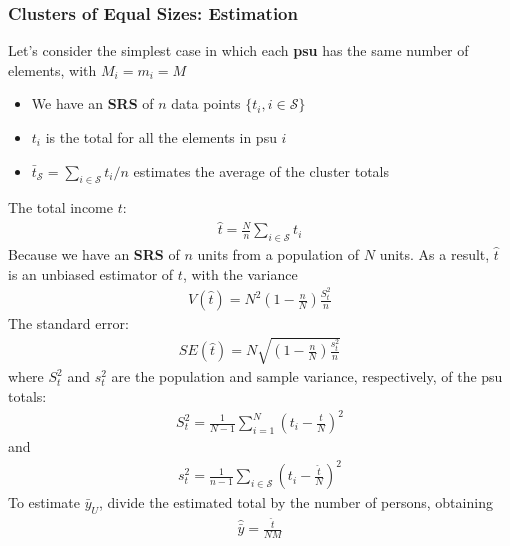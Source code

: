 \documentclass[a4paper,twoside,11pt]{article}
\begin{document}
\subsubsection{Clusters of Equal Sizes: Estimation}
Let’s consider the simplest case in which each \textbf{psu} has the same number of elements, with $M_i = m_i = M$
\begin{itemize}
    \item We have an \textbf{SRS} of $n$ data points $\{t_i, i \in \mathcal{S} \}$
    \item $t_i$ is the total for all the elements in psu $i$
    \item $\bar{t}_{\mathcal{S}} = \sum_{i \in \mathcal{S}} t_i/n$ estimates the average of the cluster totals
\end{itemize}
The total income $t:$
\begin{equation*}
\begin{aligned}
\hat{t} = \frac{N}{n} \sum_{i \in \mathcal{S}}t_i
\end{aligned}
\end{equation*}
Because we have an \textbf{SRS} of $n$ units from a population of $N$ units. As a result, $\hat{t}$ is an unbiased estimator of $t$, with the variance
\begin{equation*}
\begin{aligned}
V(\hat{t}) = N^2(1-\frac{n}{N}) \frac{S_t^2}{n}
\end{aligned}
\end{equation*}
The standard error:
\begin{equation*}
\begin{aligned}
SE(\hat{t}) = N\sqrt{(1-\frac{n}{N}) \frac{s_t^2}{n}}
\end{aligned}
\end{equation*}
where $S_t^2$ and $s_t^2$ are the population and sample variance, respectively, of the psu totals:
\begin{equation*}
\begin{aligned}
S_t^2 = \frac{1}{N-1} \sum^N_{i=1} (t_i - \frac{t}{N})^2
\end{aligned}
\end{equation*}
and 
\begin{equation*}
\begin{aligned}
s_t^2 = \frac{1}{n-1} \sum_{i \in \mathcal{S}} (t_i -\frac{\hat{t}}{N})^2
\end{aligned}
\end{equation*}
To estimate $\bar{y}_U$, divide the estimated total by the number of persons, obtaining
\begin{equation*}
\begin{aligned}
\hat{\bar{y}} = \frac{\hat{t}}{NM}
\end{aligned}
\end{equation*}
\end{document}
